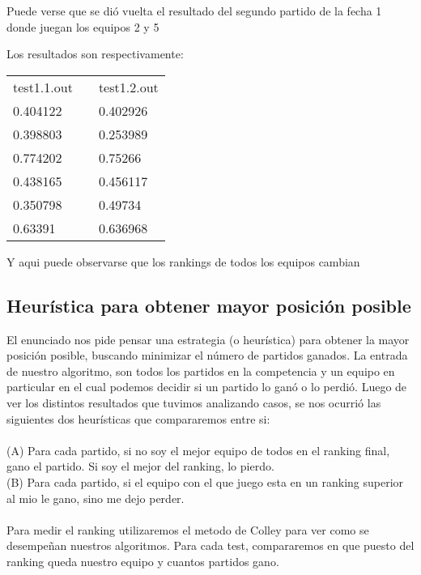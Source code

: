 Puede verse que se di\'o vuelta el resultado del segundo partido de la fecha 1 donde juegan los equipos 2 y 5


Los resultados son respectivamente:


\begin{tabular}{lll}

test1.1.out & \hspace{5em} & test1.2.out \\

0.404122	& \hspace{5em} &	0.402926	\\

0.398803	& \hspace{5em} &	0.253989	\\

0.774202	& \hspace{5em} &	0.75266	\\

0.438165	& \hspace{5em} &	0.456117	\\

0.350798	& \hspace{5em} &	0.49734	\\

0.63391		& \hspace{5em} &	0.636968	\\

\end{tabular}


Y aqui puede observarse que los rankings de todos los equipos cambian

\subsection{Heur\'istica para obtener mayor posici\'on posible}

El enunciado nos pide pensar una estrategia (o heur\'istica) para obtener la mayor posici\'on posible, buscando minimizar el n\'umero de partidos ganados. La entrada de nuestro algoritmo, son todos los partidos en la competencia y un equipo en particular en el cual podemos decidir si un partido lo gan\'o o lo perdi\'o. Luego de ver los distintos resultados que tuvimos analizando casos, se nos ocurri\'o las siguientes dos heur\'isticas que compararemos entre si:\\
\\
(A) Para cada partido, si no soy el mejor equipo de todos en el ranking final, gano el partido. Si soy el mejor del ranking, lo pierdo.\\
(B) Para cada partido, si el equipo con el que juego esta en un ranking superior al mio le gano, sino me dejo perder.\\
\\
Para medir el ranking utilizaremos el metodo de Colley para ver como se desempe\~nan nuestros algoritmos. Para cada test, compararemos en que puesto del ranking queda nuestro equipo y cuantos partidos gano.\\

